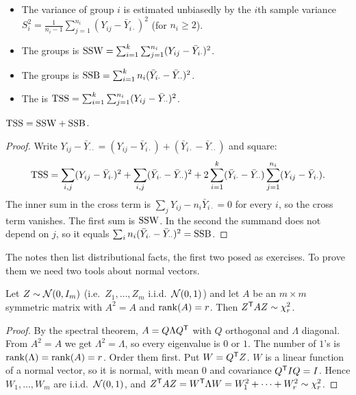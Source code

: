 \begin{definition}\label{def:L08-SS}
\begin{itemize}
  \item The variance of group $i$ is estimated unbiasedly by the $i$th sample variance
  $S_i^2=\frac{1}{n_i-1}\sum_{j=1}^{n_i}(Y_{ij}-\bar Y_{i\cdot})^2$ (for $n_i\ge 2$).
  \item The  groups is $\mathrm{SSW}=\sum_{i=1}^k\sum_{j=1}^{n_i}(Y_{ij}-\bar Y_{i\cdot})^2$.
  \item The  groups is $\mathrm{SSB}=\sum_{i=1}^k n_i(\bar Y_{i\cdot}-\bar Y_{\cdot\cdot})^2$.
  \item The  is $\mathrm{TSS}=\sum_{i=1}^k\sum_{j=1}^{n_i}(Y_{ij}-\bar Y_{\cdot\cdot})^2$.
\end{itemize}
\end{definition}

\begin{theorem}\label{thm:L08-decomp}
$\mathrm{TSS}=\mathrm{SSW}+\mathrm{SSB}$.
\end{theorem}
\begin{proof}
Write $Y_{ij}-\bar Y_{\cdot\cdot}=(Y_{ij}-\bar Y_{i\cdot})+(\bar Y_{i\cdot}-\bar Y_{\cdot\cdot})$ and square:
\[
\mathrm{TSS}=\sum_{i,j}(Y_{ij}-\bar Y_{i\cdot})^2+\sum_{i,j}(\bar Y_{i\cdot}-\bar Y_{\cdot\cdot})^2
+2\sum_{i=1}^k(\bar Y_{i\cdot}-\bar Y_{\cdot\cdot})\sum_{j=1}^{n_i}(Y_{ij}-\bar Y_{i\cdot}).
\]
The inner sum in the cross term is $\sum_j Y_{ij}-n_i\bar Y_{i\cdot}=0$ for every $i$, so the
cross term vanishes. The first sum is $\mathrm{SSW}$. In the second the summand does not depend on
$j$, so it equals $\sum_i n_i(\bar Y_{i\cdot}-\bar Y_{\cdot\cdot})^2=\mathrm{SSB}$.
\end{proof}

The notes then list distributional facts, the first two posed as exercises. To prove them we
need two tools about normal vectors.

\begin{lemma}\label{lem:L08-chisq}
Let $Z\sim\mathcal N(0,I_m)$ (i.e.\ $Z_1,\dots,Z_m$ i.i.d.\ $\mathcal N(0,1)$) and let $A$ be an $m\times m$
symmetric matrix with $A^2=A$ and $\operatorname{rank}(A)=r$. Then $Z^{\mathsf T} AZ\sim\chi^2_r$.
\end{lemma}
\begin{proof}
By the spectral theorem, $A=Q\Lambda Q^{\mathsf T}$ with $Q$ orthogonal and $\Lambda$ diagonal. From
$A^2=A$ we get $\Lambda^2=\Lambda$, so every eigenvalue is $0$ or $1$. The number of $1$'s is
$\operatorname{rank}(\Lambda)=\operatorname{rank}(A)=r$. Order them first. Put $W=Q^{\mathsf T} Z$. $W$ is a linear function of a
normal vector, so it is normal, with mean $0$ and covariance $Q^{\mathsf T} I Q=I$. Hence
$W_1,\dots,W_m$ are i.i.d.\ $\mathcal N(0,1)$, and
$Z^{\mathsf T} AZ=W^{\mathsf T}\Lambda W=W_1^2+\dots+W_r^2\sim\chi^2_r$.
\end{proof}

